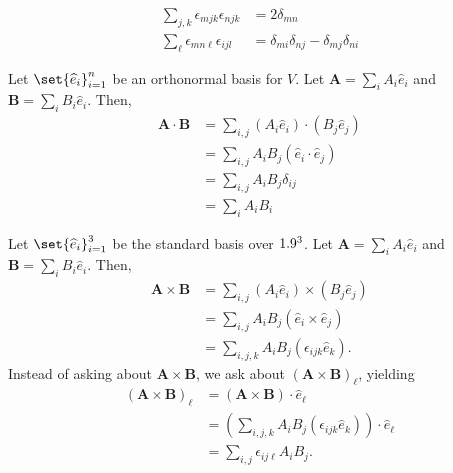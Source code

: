 \documentclass[10pt]{mypackage}
\begin{document}
\begin{exercise}
  \begin{align*}
    \sum_{j,k}\epsilon_{mjk}\epsilon_{njk} &= 2\delta_{mn}\\
    \sum_{\ell}\epsilon_{mn\ell}\epsilon_{ijl} &= \delta_{mi}\delta_{nj} - \delta_{mj}\delta_{ni}
  \end{align*}
\end{exercise}
\begin{definition}
  Let $\set{\widehat{e}_i}_{i=1}^{n}$ be an orthonormal basis for $V$. Let $\mathbf{A} = \sum_{i}A_i\widehat{e}_i$ and $\mathbf{B} = \sum_{i}B_i\widehat{e}_i$. Then,
  \begin{align*}
    \mathbf{A}\cdot \mathbf{B} &= \sum_{i,j}\left(A_i\widehat{e}_i\right)\cdot\left(B_j\widehat{e}_j\right)\\
                               &= \sum_{i,j}A_iB_j \left(\widehat{e}_i \cdot \widehat{e}_j\right)\\
                               &= \sum_{i,j}A_iB_j \delta_{ij}\\
                               &= \sum_{i}A_iB_i
  \end{align*}
\end{definition}
\begin{definition}
  Let $\set{\widehat{e}_i}_{i=1}^{3}$ be the standard basis over $1.9^3$. Let $\mathbf{A} = \sum_{i}A_i\widehat{e}_i$ and $\mathbf{B} = \sum_{i}B_i\widehat{e}_i$. Then,
  \begin{align*}
    \mathbf{A}\times \mathbf{B} &= \sum_{i,j}\left(A_i\widehat{e}_i\right)\times \left(B_j\widehat{e}_j\right)\\
                                &= \sum_{i,j}A_iB_j \left(\widehat{e}_i \times \widehat{e}_j\right)\\
                                &= \sum_{i,j,k}A_iB_j\left(\epsilon_{ijk}\widehat{e}_k\right).
  \end{align*}
  Instead of asking about $\mathbf{A}\times \mathbf{B}$, we ask about $\left(\mathbf{A}\times \mathbf{B}\right)_{\ell}$, yielding
  \begin{align*}
    \left(\mathbf{A}\times \mathbf{B}\right)_{\ell} &= \left(\mathbf{A}\times \mathbf{B}\right)\cdot \widehat{e}_{\ell}\\
                                                    &= \left(\sum_{i,j,k}A_iB_j\left(\epsilon_{ijk}\widehat{e}_k\right)\right)\cdot \widehat{e}_{\ell}\\
                                                    &= \sum_{i,j}\epsilon_{ij\ell}A_iB_j.
  \end{align*}
\end{definition}
\end{document}
